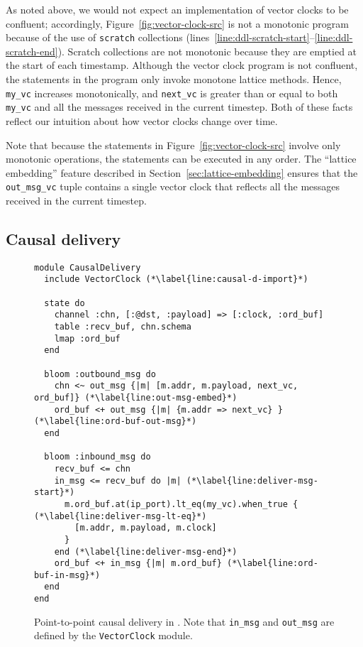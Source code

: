 As noted above, we would not expect an implementation of vector clocks to be
confluent; accordingly, Figure~\ref{fig:vector-clock-src} is not a monotonic
\lang program because of the use of \texttt{scratch} collections
(lines~\ref{line:ddl-scratch-start}--\ref{line:ddl-scratch-end}). Scratch
collections are not monotonic because they are emptied at the start of each
timestamp. Although the vector clock program is not confluent, the statements in
the program only invoke monotone lattice methods. Hence, \texttt{my\_vc}
increases monotonically, and \texttt{next\_vc} is greater than or equal to both
\texttt{my\_vc} and all the messages received in the current timestep. Both of
these facts reflect our intuition about how vector clocks change over time.

Note that because the statements in Figure~\ref{fig:vector-clock-src} involve
only monotonic operations, the statements can be executed in any order. The
``lattice embedding'' feature described in Section~\ref{sec:lattice-embedding}
ensures that the \texttt{out\_msg\_vc} tuple contains a single vector clock that
reflects all the messages received in the current timestep.


\subsection{Causal delivery}
\begin{figure}[t]
\begin{scriptsize}
\begin{lstlisting}
module CausalDelivery
  include VectorClock (*\label{line:causal-d-import}*)

  state do
    channel :chn, [:@dst, :payload] => [:clock, :ord_buf]
    table :recv_buf, chn.schema
    lmap :ord_buf
  end

  bloom :outbound_msg do
    chn <~ out_msg {|m| [m.addr, m.payload, next_vc, ord_buf]} (*\label{line:out-msg-embed}*)
    ord_buf <+ out_msg {|m| {m.addr => next_vc} } (*\label{line:ord-buf-out-msg}*)
  end

  bloom :inbound_msg do
    recv_buf <= chn
    in_msg <= recv_buf do |m| (*\label{line:deliver-msg-start}*)
      m.ord_buf.at(ip_port).lt_eq(my_vc).when_true { (*\label{line:deliver-msg-lt-eq}*)
        [m.addr, m.payload, m.clock]
      }
    end (*\label{line:deliver-msg-end}*)
    ord_buf <+ in_msg {|m| m.ord_buf} (*\label{line:ord-buf-in-msg}*)
  end
end
\end{lstlisting}
\end{scriptsize}
\caption{Point-to-point causal delivery in \lang. Note that \texttt{in\_msg} and
\texttt{out\_msg} are defined by the \texttt{VectorClock} module.}
\label{fig:causal-delivery-src}
\end{figure}

